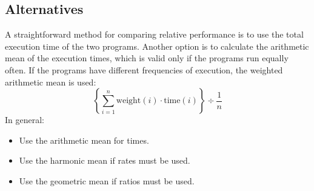 \subsection{Alternatives}
A straightforward method for comparing relative performance is to use the total execution time of the two programs. 
Another option is to calculate the arithmetic mean of the execution times, which is valid only if the programs run equally often. 
If the programs have different frequencies of execution, the weighted arithmetic mean is used:
\[\left\{ \sum_{i=1}^{n} \text{weight}(i) \cdot \text{time}(i) \right\} \div \dfrac{1}{n}\]
In general:
\begin{itemize}
    \item Use the arithmetic mean for times.
    \item Use the harmonic mean if rates must be used.
    \item Use the geometric mean if ratios must be used.
\end{itemize}